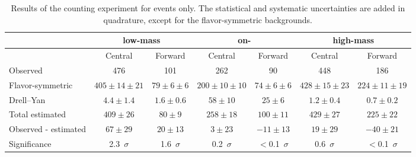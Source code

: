 
\begin{table}[hbtp]
 \renewcommand{\arraystretch}{1.3}
 \setlength{\belowcaptionskip}{6pt}
 \scriptsize
 \centering
 \caption{Results of the counting experiment for \MM events only.
     The statistical and systematic uncertainties are added in quadrature, except for the flavor-symmetric backgrounds.
     }
  \label{tab:METresults2012MM}
  \begin{tabular}{l| cc | cc | cc}

    							& \multicolumn{2}{c}{low-mass} & \multicolumn{2}{c}{on-\Z} & \multicolumn{2}{c}{high-mass} \\ 

    \hline
                                &  Central        & Forward  &  Central  & Forward   &  Central        & Forward \\ 

    \hline
        Observed       &  476                   & 101              &  262            &  90       &   448           &   186    \\

    \hline
        Flavor-symmetric    & $405\pm14\pm21$        & $79\pm6\pm6$  &  $200\pm10\pm10$ & $74\pm6\pm6$ & $428\pm15\pm23$ & $224\pm11\pm19$ \\

            Drell--Yan          & $4.4\pm1.4$            & $1.6\pm0.6$      & $58\pm10$ & $25\pm6$ & $1.2\pm0.4$ & $0.7\pm0.2$ \\

    \hline
            Total estimated          & $409\pm26$            & $80\pm9$      & $258\pm18$ & $100\pm11$ & $429\pm27$ & $225\pm22$ \\

    \hline
         Observed - estimated  & $67\pm29$      & $20\pm13$ & $3\pm23 $ & $-11\pm13$ & $19\pm29$ & $-40\pm21 $ \\ 

    \hline
   Significance      & 2.3~$\sigma$    &  1.6~$\sigma$  & 0.2~$\sigma$ & $<$0.1~$\sigma$ & 0.6~$\sigma$ & $<$0.1~$\sigma$ \\ 


  \end{tabular}
\end{table}


